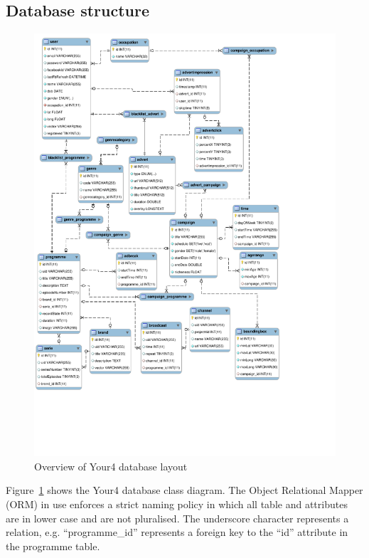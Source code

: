 \subsection{Database structure}

\begin{figure}[H]
	\centering
	\includegraphics[trim = 0 3.7cm 3.5cm 0, clip, width=\textwidth]{images/your4-db.pdf}
	\caption{Overview of Your4 database layout}
	\label{fig:your4-db}
\end{figure}

Figure~\ref{fig:your4-db} shows the Your4 database class diagram. The Object Relational Mapper (ORM) in use enforces a strict naming policy in which all table and attributes are in lower case and are not pluralised. The underscore character represents a relation, e.g. ``programme\_id'' represents a foreign key to the ``id'' attribute in the programme table.

